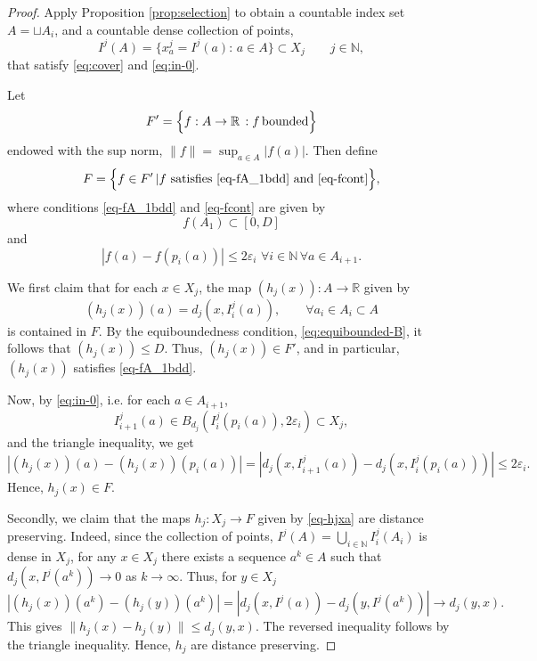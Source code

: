 \documentclass[a4paper,12pt,reqno]{amsart}
\theoremstyle{plain}
\newcommand{\be}{\begin{equation}}
\newcommand{\ee}{\end{equation}}
\newcommand{\disjointunion}{\sqcup}
\begin{document}
\bigskip 

\begin{proof}
Apply Proposition \ref{prop:selection}
to obtain a
countable index set $A=\disjointunion A_i$,  and 
a countable dense collection of points,
\be
I^j(A)=\{x^j_{a}=I^j(a):\,a\in A\}\subset X_j \qquad j \in \mathbb N,
\ee
that satisfy \eqref{eq:cover} and \eqref{eq:in-0}. 


Let 
\be
F'= \Bigl\{ f : A \to \mathbb{R} \, : f \,\text{bounded} \Bigr\} 
\ee
endowed with the sup norm,
$\|f\| = \sup_{a \in A} |f(a)|$. Then define 
\be
F = \Bigl\{ f \in F'  \, | f \text{ satisfies  \eqref{eq-fA_1bdd} and \eqref{eq-fcont}} \Bigr\},
\ee
where conditions  \eqref{eq-fA_1bdd} and \eqref{eq-fcont} are given by 
 \be\label{eq-fA_1bdd}
f(A_1) \subset [0,D]
 \ee
 and 
 \be\label{eq-fcont}
|f(a) - f(p_i(a))| \leq 2\varepsilon_i \,\, \forall i \in \mathbb N\,\forall a \in A_{i+1}.
 \ee

\medskip


We first claim that for each $x \in X_j$, the map $(h_j(x)) : A \to \mathbb R$ given by  
\be\label{eq-hjxa}
(h_j(x))(a) =d_j(x, I^j_i(a)), \qquad \forall a_i \in A_i \subset A
\ee
is contained in $F$. 
By  the equiboundedness condition, \eqref{eq:equibounded-B}, 
it follows that $(h_j(x))\leq D$.
Thus, $(h_j(x)) \in F'$, and in particular, $(h_j(x))$ satisfies \eqref{eq-fA_1bdd}.



Now, by \eqref{eq:in-0}, i.e. for each $a \in A_{i+1}$,  
\[
I^j_{i+1}(a) \in B_{d_j}(I^j_i(p_i(a)), 2\varepsilon_i)\subset X_j,
\]
and the triangle inequality, we get
\[
|(h_j(x))(a) - (h_j(x))(p_i(a))|= |d_j(x, I^j_{i+1}(a)) - d_j(x, I^j_i(p_i(a)))| \leq 2 \varepsilon_i.
\]
Hence, $h_j(x) \in F$. 

\medskip

Secondly, we claim that the maps $h_j : X_j \to F$ given by \eqref{eq-hjxa} are distance preserving. Indeed, since the collection of points,
$I^j(A)=\bigcup_{i\in {\mathbb N}} I^j_i(A_i)$ is dense in $X_j$, 
for any $x \in X_j$ there exists a sequence $a^k \in A$ such that $d_j(x,I^j(a^k)) \to 0$ as $k \to \infty$. 
Thus, for  $y \in X_j$ 
\[
|(h_j(x))(a^k) - (h_j(y))(a^k)|= |d_j(x, I^j(a)) - d_j(y, I^j(a^k))| \to d_j(y, x).
\]
This gives 
$\| h_j(x) - h_j(y)\| \leq d_j(y, x)$. The reversed inequality follows by the triangle inequality. Hence, $h_j$ are distance preserving.

\medskip


\end{proof}
\end{document}
